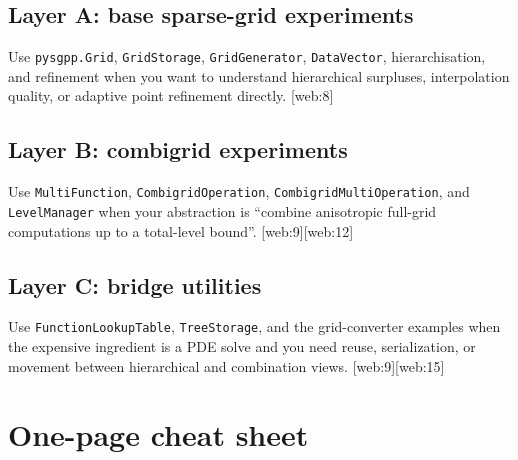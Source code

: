 \documentclass[11pt,a4paper]{article}
\begin{document}
\subsection*{Layer A: base sparse-grid experiments}
Use \texttt{pysgpp.Grid}, \texttt{GridStorage}, \texttt{GridGenerator}, \texttt{DataVector}, hierarchisation, and refinement when you want to understand hierarchical surpluses, interpolation quality, or adaptive point refinement directly. [web:8]  

\subsection*{Layer B: combigrid experiments}
Use \texttt{MultiFunction}, \texttt{CombigridOperation}, \texttt{CombigridMultiOperation}, and \texttt{LevelManager} when your abstraction is ``combine anisotropic full-grid computations up to a total-level bound''. [web:9][web:12]  

\subsection*{Layer C: bridge utilities}
Use \texttt{FunctionLookupTable}, \texttt{TreeStorage}, and the grid-converter examples when the expensive ingredient is a PDE solve and you need reuse, serialization, or movement between hierarchical and combination views. [web:9][web:15]  

\section{One-page cheat sheet}
\end{document}
